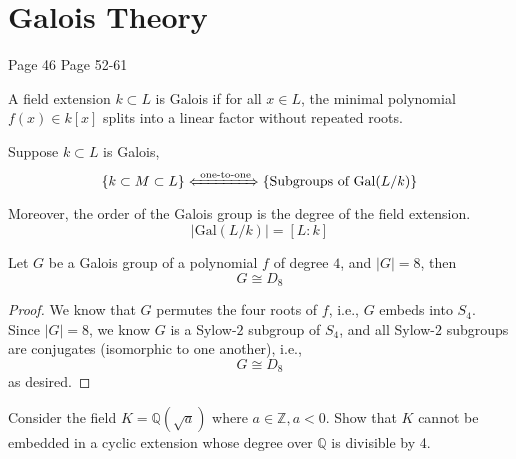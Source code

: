 \chapter{Galois Theory}
Page 46
Page 52-61

\begin{defn}
    A field extension $k\subset L$ is Galois if for all $x\in L$, the minimal polynomial $f(x)\in k[x]$ splits into a linear factor without repeated roots.
\end{defn}

\begin{thm}
    Suppose $k\subset L$ is Galois, 
    \begin{equation*}
        \left\{ k\subset M\subset L\right\} \xLeftrightarrow{\text{ one-to-one}} \left\{\text{Subgroups of Gal}(L/k) \right\}
    \end{equation*}
    Moreover, the order of the Galois group is the degree of the field extension.
    \begin{equation*}
        \left|\text{Gal}(L/k)\right|=[L:k]
    \end{equation*}
\end{thm}



\begin{prop}
    Let $G$ be a Galois group of a polynomial $f$ of degree $4$, and $|G|=8$, then 
    \begin{equation*}
        G\cong D_8
    \end{equation*}
\end{prop}
\begin{proof}
    We know that $G$ permutes the four roots of $f$, i.e., $G$ embeds into $S_4$. Since $|G|=8$, we know $G$ is a Sylow-$2$ subgroup of $S_4$, and all Sylow-$2$ subgroups are conjugates (isomorphic to one another), i.e., 
    \begin{equation*}
        G\cong D_8
    \end{equation*}
    as desired.
\end{proof}




\begin{prob}[S2009-Q3]
    Consider the field \(K = \mathbb{Q}(\sqrt{a})\) where \(a \in \mathbb{Z}, a < 0\). Show that \(K\) cannot be embedded in a cyclic extension whose degree over \(\mathbb{Q}\) is divisible by 4.
\end{prob}


